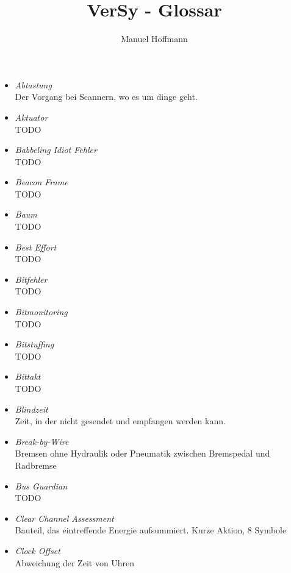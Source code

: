 \documentclass{article}
\title{VerSy - Glossar}
\author{Manuel Hoffmann}
\begin{document}
\begin{itemize}
	\item \emph{Abtastung}\\
		Der Vorgang bei Scannern, wo es um dinge geht.

	\item \emph{Aktuator}\\
		TODO

	\item \emph{Babbeling Idiot Fehler}\\
		TODO

	\item \emph{Beacon Frame}\\
		TODO

	\item \emph{Baum}\\
		TODO

	\item \emph{Best Effort}\\
		TODO

	\item \emph{Bitfehler}\\
		TODO

	\item \emph{Bitmonitoring}\\
		TODO

	\item \emph{Bitstuffing}\\
		TODO

	\item \emph{Bittakt}\\
		TODO

	\item \emph{Blindzeit}\\
		Zeit, in der nicht gesendet und empfangen werden kann.

	\item \emph{Break-by-Wire}\\
		Bremsen ohne Hydraulik oder Pneumatik zwischen Bremspedal und Radbremse

	\item \emph{Bus Guardian}\\
		TODO

	\item \emph{Clear Channel Assessment}\\
		Bauteil, das eintreffende Energie aufsummiert. Kurze Aktion, 8 Symbole

	\item \emph{Clock Offset}\\
		Abweichung der Zeit von Uhren


\end{itemize}
\end{document}
